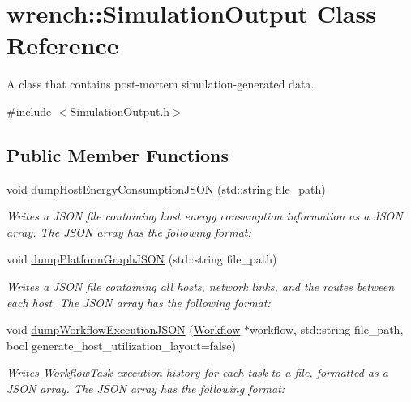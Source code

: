 \hypertarget{classwrench_1_1_simulation_output}{}\section{wrench\+:\+:Simulation\+Output Class Reference}
\label{classwrench_1_1_simulation_output}


A class that contains post-\/mortem simulation-\/generated data.  




{\ttfamily \#include $<$Simulation\+Output.\+h$>$}

\subsection*{Public Member Functions}
\begin{DoxyCompactItemize}
\item 
void \hyperlink{classwrench_1_1_simulation_output_a789834c9727ec0cd28faaf5176eaeecf}{dump\+Host\+Energy\+Consumption\+J\+S\+ON} (std\+::string file\+\_\+path)
\begin{DoxyCompactList}\small\item\em Writes a J\+S\+ON file containing host energy consumption information as a J\+S\+ON array.  The J\+S\+ON array has the following format\+: \end{DoxyCompactList}\item 
void \hyperlink{classwrench_1_1_simulation_output_ac30cdf1fcfe9f3c61351d49acc36db52}{dump\+Platform\+Graph\+J\+S\+ON} (std\+::string file\+\_\+path)
\begin{DoxyCompactList}\small\item\em Writes a J\+S\+ON file containing all hosts, network links, and the routes between each host.  The J\+S\+ON array has the following format\+: \end{DoxyCompactList}\item 
void \hyperlink{classwrench_1_1_simulation_output_a7a85709b2581c90b53c217e6805cf56c}{dump\+Workflow\+Execution\+J\+S\+ON} (\hyperlink{classwrench_1_1_workflow}{Workflow} $\ast$workflow, std\+::string file\+\_\+path, bool generate\+\_\+host\+\_\+utilization\+\_\+layout=false)
\begin{DoxyCompactList}\small\item\em Writes \hyperlink{classwrench_1_1_workflow_task}{Workflow\+Task} execution history for each task to a file, formatted as a J\+S\+ON array.  The J\+S\+ON array has the following format\+: \end{DoxyCompactList}\item 

\end{DoxyCompactItemize}
